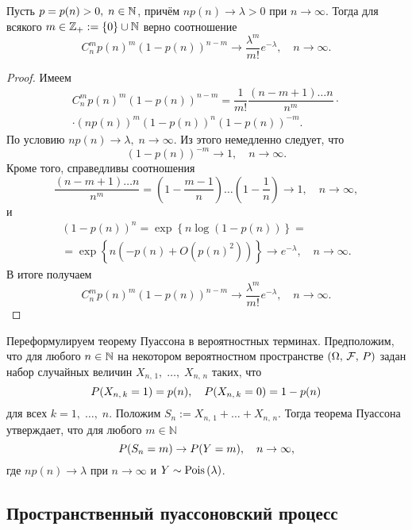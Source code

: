 \begin{theorem}\label{lect06:th1}
Пусть $p=p(n)>0,\;n\in\N$, причём $np(n)\to\lambda>0$ при $n\to\infty$. Тогда для всякого $m\in\mathbb{Z}_+:=\{0\}\cup\N$ верно соотношение
\[ C_n^mp(n)^m(1-p(n))^{n-m}\to\dfrac{\lambda^m}{m!}e^{-\lambda},\quad n\to\infty. \]
\end{theorem}
\begin{proof}
Имеем
\begin{multline*}
C_n^mp(n)^m(1-p(n))^{n-m}=\dfrac{1}{m!}\dfrac{(n-m+1)\ldots n}{n^m}\cdot\\\cdot(np(n))^m(1-p(n))^n(1-p(n))^{-m}.
\end{multline*}
По условию $np(n)\to\lambda,\;n\to\infty$. Из этого немедленно следует, что 
\[ (1-p(n))^{-m}\to 1,\quad n\to\infty. \] 
Кроме того, справедливы соотношения
\[ \dfrac{(n-m+1)\ldots n}{n^m}=\left(1-\dfrac{m-1}{n}\right)\ldots\left(1-\dfrac{1}{n}\right)\to 1,\quad n\to\infty, \]
и
\begin{multline*}
(1-p(n))^n=\exp\left\{n\log(1-p(n))\right\}=\\
=\exp\left\{n\left(-p(n)+O\left(p(n)^2\right)\right)\right\}\to e^{-\lambda},\quad n\to\infty.
\end{multline*}
В итоге получаем
\[ C_n^mp(n)^m(1-p(n))^{n-m}\to\dfrac{\lambda^m}{m!}e^{-\lambda},\quad n\to\infty. \] 
\end{proof}

Переформулируем теорему Пуассона в вероятностных терминах. Предположим, что для любого $n\in\N$ на некотором вероятностном пространстве $(\Omega,\,\mathcal{F},\,\P)$ задан набор случайных величин $X_{n,\,1},\;\ldots,\;X_{n,\,n}$ таких, что
\[ \P(X_{n,\,k}=1)=p(n),\quad \P(X_{n,\,k}=0)=1-p(n) \]
для всех $k=1,\;\ldots,\;n$. Положим $S_n:=X_{n,\,1}+\ldots+X_{n,\,n}$. Тогда теорема Пуассона утверждает, что для любого $m\in\mathbb{N}$
\[ \P(S_n=m)\to\P(Y=m),\quad n\to\infty, \]
где $np(n)\to\lambda$ при $n\to\infty$ и $Y\sim\textnormal{Pois}\,(\lambda)$.

\subsection{Пространственный пуассоновский процесс}


